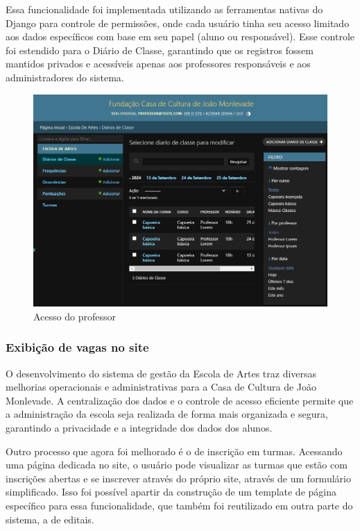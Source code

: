 Essa funcionalidade foi implementada utilizando as ferramentas nativas do Django para controle de permissões, onde cada usuário tinha seu acesso limitado aos dados específicos com base em seu papel (aluno ou responsável). Esse controle foi estendido para o Diário de Classe, garantindo que os registros fossem mantidos privados e acessíveis apenas aos professores responsáveis e aos administradores do sistema.

\begin{figure}[htb]
	\caption{\label{fig_grafico}Acesso do professor}
	\begin{center}
	    \includegraphics[scale=0.3]{./img/admin_professor.png}
	\end{center}
\end{figure}

\subsubsection{Exibição de vagas no site}

O desenvolvimento do sistema de gestão da Escola de Artes traz diversas melhorias operacionais e administrativas para a Casa de Cultura de João Monlevade. A centralização dos dados e o controle de acesso eficiente permite que a administração da escola seja realizada de forma mais organizada e segura, garantindo a privacidade e a integridade dos dados dos alunos.

Outro processo que agora foi melhorado é o de inscrição em turmas. Acessando uma página dedicada no site, o usuário pode visualizar as turmas que estão com inscrições abertas e se inscrever através do próprio site, através de um formulário simplificado. Isso foi possível apartir da construção de um template de página específico para essa funcionalidade, que também foi reutilizado em outra parte do sistema, a de editais.

